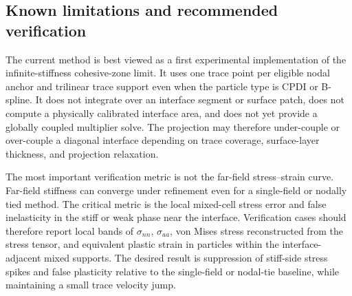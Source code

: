 \subsection{Known limitations and recommended verification}

The current method is best viewed as a first experimental implementation of the infinite-stiffness cohesive-zone limit.  It uses one trace point per eligible nodal anchor and trilinear trace support even when the particle type is CPDI or B-spline.  It does not integrate over an interface segment or surface patch, does not compute a physically calibrated interface area, and does not yet provide a globally coupled multiplier solve.  The projection may therefore under-couple or over-couple a diagonal interface depending on trace coverage, surface-layer thickness, and projection relaxation.

The most important verification metric is not the far-field stress--strain curve.  Far-field stiffness can converge under refinement even for a single-field or nodally tied method.  The critical metric is the local mixed-cell stress error and false inelasticity in the stiff or weak phase near the interface.  Verification cases should therefore report local bands of $\sigma_{nn}$, $\sigma_{aa}$, von Mises stress reconstructed from the stress tensor, and equivalent plastic strain in particles within the interface-adjacent mixed supports.  The desired result is suppression of stiff-side stress spikes and false plasticity relative to the single-field or nodal-tie baseline, while maintaining a small trace velocity jump.

